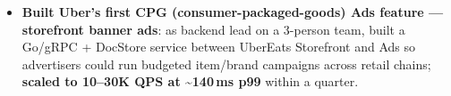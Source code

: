 \documentclass{resume-v2}
\begin{document}
\begin{itemize}
  \item \textbf{Built Uber's first CPG (consumer-packaged-goods) Ads feature --- storefront banner ads}: as backend lead on a 3-person team, built a Go/gRPC + DocStore service between UberEats Storefront and Ads so advertisers could run budgeted item/brand campaigns across retail chains; \textbf{scaled to 10--30K QPS at \textasciitilde140\,ms p99} within a quarter.

\end{itemize}
\end{document}
